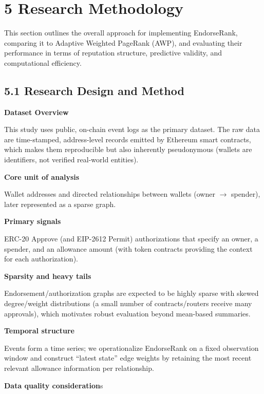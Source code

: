 \documentclass[12pt]{article}
\begin{document}
\clearpage
{}
\section*{5 \textbf{Research Methodology}}
\label{sec:research-methodology}

This section outlines the overall approach for implementing EndorseRank, comparing it to Adaptive Weighted PageRank (AWP), and evaluating their performance in terms of reputation structure, predictive validity, and computational efficiency.


\subsection*{5.1 Research Design and Method}
\label{sec:research-design-and-method}

\textbf{Dataset Overview}


This study uses public, on-chain event logs as the primary dataset. The raw data are time-stamped, address-level records emitted by Ethereum smart contracts, which makes them reproducible but also inherently pseudonymous (wallets are identifiers, not verified real-world entities).


\textbf{Core unit of analysis}


Wallet addresses and directed relationships between wallets (owner \(\to\) spender), later represented as a sparse graph.


\textbf{Primary signals}


ERC-20 Approve (and EIP-2612 Permit) authorizations that specify an owner, a spender, and an allowance amount (with token contracts providing the context for each authorization).


\textbf{Sparsity and heavy tails}


Endorsement/authorization graphs are expected to be highly sparse with skewed degree/weight distributions (a small number of contracts/routers receive many approvals), which motivates robust evaluation beyond mean-based summaries.


\textbf{Temporal structure}


Events form a time series; we operationalize EndorseRank on a fixed observation window and construct ``latest state'' edge weights by retaining the most recent relevant allowance information per relationship.


\textbf{Data quality consideration}s
\end{document}
